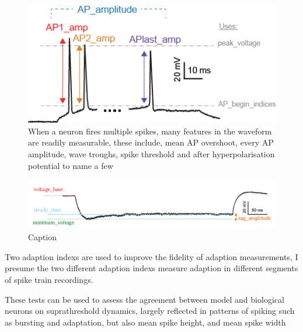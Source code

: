 \begin{figure}
    \centering
    \includegraphics{figures/AP_Amplitude.png}
    \caption[]{When a neuron fires multiple spikes, many features in the waveform are readily measurable, these include, mean AP overshoot, every AP amplitude, wave troughs, spike threshold and after hyperpolarisation potential to name a few}
    \label{fig:features_example}
\end{figure}

\begin{figure}
    \centering
    \includegraphics{figures/sag_amplitude}
    \caption{Caption}
    \label{fig:sag_amplitude}
\end{figure}

Two adaption indexs are used to improve the fidelity of adaption measurements, I presume the two different adaption indexs measure adaption in different segments of spike train recordings.


These tests can be used to assess the agreement between model and biological neurons on suprathreshold dynamics, largely reflected in patterns of spiking such as bursting and adaptation, but also mean spike height, and mean spike width

